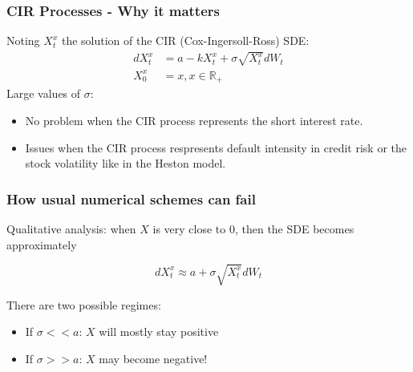 \documentclass[12pt]{beamer}
\begin{document}
\begin{frame}
\frametitle{CIR Processes - Why it matters}
Noting $X^{x}_{t}$ the solution of the CIR (Cox-Ingersoll-Ross) SDE:
\begin{align*}
dX^{x}_{t} & = a - kX^{x}_{t} + \sigma \sqrt{X^{x}_{t}} dW_{t} \\
X^{x}_{0} & = x, x \in \mathbb{R_{+}}
\end{align*}
Large values of $\sigma$:
\begin{itemize}
  \item No problem when the CIR process represents the short interest rate.
  \item Issues when the CIR process respresents default intensity in credit risk or the stock volatility like in the Heston model.
\end{itemize}
\end{frame}

\begin{frame}
\frametitle{How usual numerical schemes can fail}
Qualitative analysis: when $X$ is very close to $0$, then the SDE becomes approximately

$$
dX^{x}_{t} \approx a + \sigma \sqrt{X^{x}_{t}} dW_{t}
$$

There are two possible regimes:
\begin{itemize}
	\item If $\sigma << a$: $X$ will mostly stay positive
	\item If $\sigma >> a$: $X$ may become negative!
\end{itemize}
\end{frame}
\end{document}
